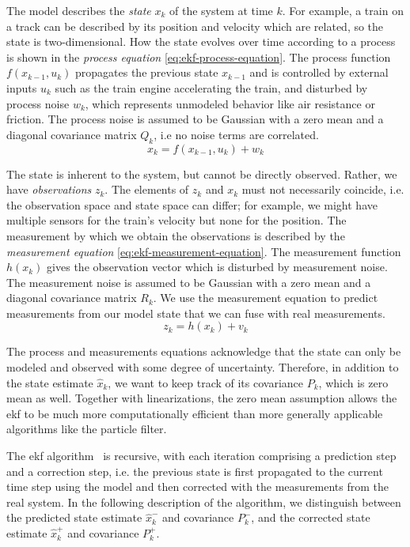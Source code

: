 The model describes the \textit{state} $x_k$ of the system at time $k$. For example, a train on a track can be described by its position and velocity which are related, so the state is two-dimensional. How the state evolves over time according to a process is shown in the \textit{process equation} \ref{eq:ekf-process-equation}. The process function $f(x_{k-1}, u_k)$ propagates the previous state $x_{k-1}$ and is controlled by external inputs $u_k$ such as the train engine accelerating the train, and disturbed by process noise $w_k$, which represents unmodeled behavior like air resistance or friction. The process noise is assumed to be Gaussian with a zero mean and a diagonal covariance matrix $Q_k$, i.e no noise terms are correlated.
\begin{equation}\label{eq:ekf-process-equation}%
x_k = f(x_{k-1}, u_k) + w_k%
\end{equation}

The state is inherent to the system, but cannot be directly observed. Rather, we have \textit{observations} $z_k$. The elements of $z_k$ and $x_k$ must not necessarily coincide, i.e. the observation space and state space can differ; for example, we might have multiple sensors for the train's velocity but none for the position. The measurement by which we obtain the observations is described by the \textit{measurement equation} \ref{eq:ekf-measurement-equation}. The measurement function $h(x_k)$ gives the observation vector which is disturbed by measurement noise. The measurement noise is assumed to be Gaussian with a zero mean and a diagonal covariance matrix $R_k$. We use the measurement equation to predict measurements from our model state that we can fuse with real measurements.
\begin{equation}\label{eq:ekf-measurement-equation}%
z_k = h(x_k) + v_k%
\end{equation}

The process and measurements equations acknowledge that the state can only be modeled and observed with some degree of uncertainty. Therefore, in addition to the state estimate $\hat{x}_k$, we want to keep track of its covariance $P_k$, which is zero mean as well. Together with linearizations, the zero mean assumption allows the \gls{ekf} to be much more computationally efficient than more generally applicable algorithms like the particle filter.

The \gls{ekf} algorithm~\cite[p.~16~ff.]{Haykin.2001} is recursive, with each iteration comprising a prediction step and a correction step, i.e. the previous state is first propagated to the current time step using the model and then corrected with the measurements from the real system. In the following description of the algorithm, we distinguish between the predicted state estimate $\hat{x}_k^-$ and covariance $P_k^-$, and the corrected state estimate $\hat{x}_k^+$ and covariance $P_k^+$.

